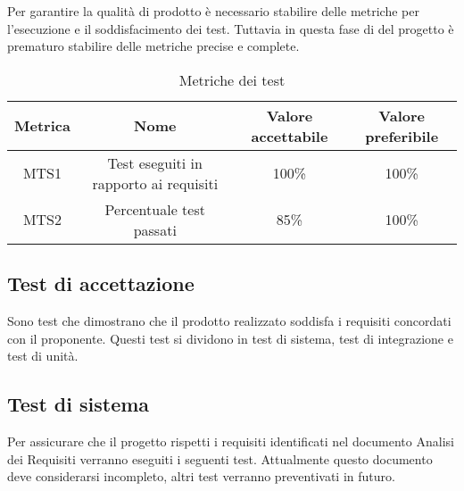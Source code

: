 \documentclass[../piano_di_qualifica.tex]{subfiles}
\begin{document}
Per garantire la qualità di prodotto è necessario stabilire delle metriche per l’esecuzione e il soddisfacimento dei test. Tuttavia in questa fase di del progetto è prematuro stabilire delle metriche precise e complete. 


\begin{table}[!ht]
\centering
\begin{tabular}{|c|c|c|c|}
		\hline
		\rowcolor{lightgray}
		\textbf{Metrica} & \textbf{Nome} &  \textbf{Valore accettabile} & \textbf{Valore preferibile} \\
		\hline 
		MTS1 & Test eseguiti in rapporto ai requisiti & 100\% & 100\% \\
 		\hline
		MTS2 & Percentuale test passati & 85\% & 100\% \\
		\hline
\end{tabular}
\caption{Metriche dei test}
\end{table}

\subsection{Test di accettazione}%
\label{sub:test_accett}
Sono test che dimostrano che il prodotto realizzato soddisfa i requisiti concordati con il proponente. 
Questi test si dividono in test di sistema, test di integrazione e test di unità.

\subsection{Test di sistema}%
\label{sub:test_sist}
Per assicurare che il progetto rispetti i requisiti identificati nel documento Analisi dei Requisiti verranno eseguiti i seguenti test. Attualmente questo documento deve considerarsi incompleto, altri test verranno preventivati in futuro. \\
\end{document}
